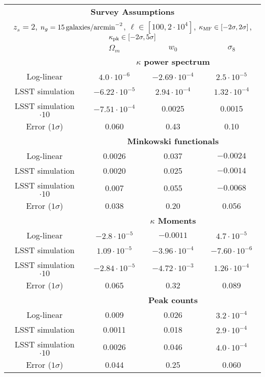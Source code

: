 \begin{table}
\begin{center}
\begin{tabular}{c|ccc} 
\multicolumn{4}{c}{\textbf{Survey Assumptions}} \\
\multicolumn{4}{c}{$z_s=2$, $n_g=15\,{\rm galaxies/arcmin}^{-2}$, $\ell\in[100,2\cdot10^4]$, $\kappa_{\rm MF}\in[-2\sigma,2\sigma]$, $\kappa_{\rm pk}\in[-2\sigma,5\sigma]$} \\ \hline \hline

& $\Omega_m$ & $w_0$ & $\sigma_8$  \\ \hline \hline 
&\multicolumn{3}{c}{\textbf{$\kappa$ power spectrum}} \\ 
Log-linear & $4.0\cdot 10^{-6}$  & $-2.69\cdot 10^{-4}$ & $2.5\cdot 10^{-5}$ \\
LSST simulation &  $-6.22\cdot10^{-5}$ &  $2.94\cdot10^{-4}$ &  $1.32\cdot10^{-4}$ \\
LSST simulation $\cdot 10$ & $-7.51\cdot10^{-4}$ &  0.0025 &  0.0015 \\ 
Error ($1\sigma$) & 0.060 & 0.43 & 0.10 \\ \hline \hline

&\multicolumn{3}{c}{\textbf{Minkowski functionals}} \\ 
Log-linear & 0.0026 &0.037 & $-0.0024$ \\
LSST simulation & 0.0020 &  0.025 & $-0.0014$ \\
LSST simulation $\cdot 10$ & 0.007 & 0.055 & $-0.0068$ \\ 
Error ($1\sigma$) & 0.038 &0.20  &0.056 \\ \hline

&\multicolumn{3}{c}{\textbf{$\kappa$ Moments}} \\ 
Log-linear & $-2.8\cdot 10^{-5}$ & $-0.0011$  & $4.7\cdot 10^{-5}$ \\
LSST simulation & $1.09\cdot10^{-5}$ & $-3.96\cdot10^{-4}$ & $-7.60\cdot10^{-6}$ \\
LSST simulation $\cdot 10$ & $-2.84\cdot10^{-5}$ & $-4.72\cdot10^{-3}$ &  $1.26\cdot10^{-4}$ \\ 
Error ($1\sigma$) & 0.065 &0.32  & 0.089  \\ \hline \hline

&\multicolumn{3}{c}{\textbf{Peak counts}} \\ 
Log-linear & 0.009 & 0.026 & $3.2\cdot 10^{-4}$ \\
LSST simulation & 0.0011 &  0.018 &  $2.9\cdot10^{-4}$ \\
LSST simulation $\cdot 10$ & 0.0026 & 0.046 & $4.0\cdot10^{-4}$ \\ 
Error ($1\sigma$) & 0.044  & 0.25  & 0.060 \\ \hline \hline


\end{tabular}
\end{center}
\end{table}
